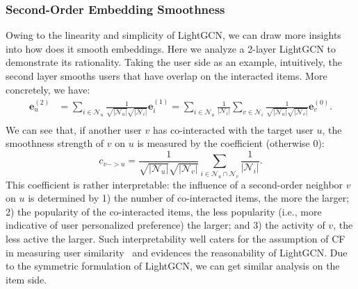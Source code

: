 \subsubsection{Second-Order Embedding Smoothness} \label{ss:second-order}
Owing to the linearity and simplicity of LightGCN, we can draw more insights into how does it smooth embeddings. Here we analyze a 2-layer LightGCN to demonstrate its rationality. Taking the user side as an example, intuitively, the second layer smooths users that have overlap on the interacted items. More concretely, we have:
\begin{equation}
\begin{aligned}
    \textbf{e}_{u}^{(2)} &= \sum_{i \in \mathcal{N}_u} \frac{1}{\sqrt{|\mathcal{N}_u|}\sqrt{|\mathcal{N}_i|}} \textbf{e}_i^{(1)} = \sum_{i \in \mathcal{N}_u} \frac{1}{|\mathcal{N}_i|} \sum_{v\in \mathcal{N}_i} \frac{1}{\sqrt{|\mathcal{N}_u|}\sqrt{|\mathcal{N}_v|} } \textbf{e}_{v}^{(0)}. \\ 
\end{aligned}
\end{equation}
We can see that, if another user $v$ has co-interacted with the target user $u$, the smoothness strength of $v$ on $u$ is measured by the coefficient (otherwise 0):
\begin{equation}\label{eq:c_vu}
    c_{v -> u} = \frac{1}{\sqrt{|\mathcal{N}_u|}\sqrt{|\mathcal{N}_v|}} \sum_{i \in \mathcal{N}_u \cap \mathcal{N}_v} \frac{1}{|\mathcal{N}_i|}. 
\end{equation}
This coefficient is rather interpretable: the influence of a second-order neighbor $v$ on $u$ is determined by 1) the number of co-interacted items, the more the larger; 2) the popularity of the co-interacted items, the less popularity (i.e., more indicative of user personalized preference) the larger; and 3) the activity of $v$, the less active the larger. 
Such interpretability well caters for the assumption of CF in measuring user similarity~\cite{CSE,Wang:2006} and evidences the reasonability of LightGCN. 
Due to the symmetric formulation of LightGCN, we can get similar analysis on the item side. 

